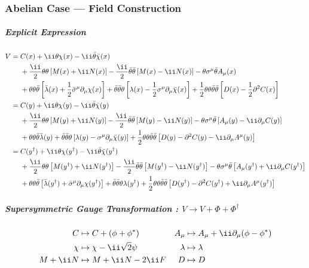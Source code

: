 \subsubsection{Abelian Case --- Field Construction}
\subparagraph{Explicit Expression}
\begin{align}
 V
={}& C(x) + \ii\theta\chi(x) - \ii\btheta\bar\chi(x)\notag
 \\& + \frac\ii2\thth\left[M(x)+\ii N(x)\right]
     - \frac\ii2\bthth\left[M(x)-\ii N(x)\right]
     - \theta\Sm\btheta A_\mu(x)\notag
 \\& + \thth\btheta\left[\bar\lambda(x)+\frac12\bSm\Pm\chi(x)\right]
     + \bthth\theta\left[\lambda(x)-\frac12\Sm\Pm\bar\chi(x)\right]
     + \frac12\thth\bthth\left[D(x)-\frac12\Psq C(x)\right] \\
={}& C(y) + \ii\theta\chi(y) - \ii\btheta\bar\chi(y)\notag
 \\& + \frac\ii2\thth\left[M(y)+\ii N(y)\right]
     - \frac\ii2\bthth\left[M(y)-\ii N(y)\right]
     - \theta\Sm\btheta \left[A_\mu(y)-\ii\Pm C(y)\right]\notag
 \\& + \thth\btheta\bar\lambda(y)
     + \bthth\theta\left[\lambda(y)-\Sm\Pm\bar\chi(y)\right]
     + \frac12\thth\bthth\left[D(y)-\Psq C(y)-\ii\Pm A^\mu(y)\right] \\
={}& C(y^\dagger) + \ii\theta\chi(y^\dagger) - \ii\btheta\bar\chi(y^\dagger)\notag
 \\& + \frac\ii2\thth\left[M(y^\dagger)+\ii N(y^\dagger)\right]
     - \frac\ii2\bthth\left[M(y^\dagger)-\ii N(y^\dagger)\right]
     - \theta\Sm\btheta \left[A_\mu(y^\dagger)+\ii\Pm C(y^\dagger)\right]\notag
 \\& + \thth\btheta\left[\bar\lambda(y^\dagger)+\bSm\Pm\chi(y^\dagger)\right]
     + \bthth\theta\lambda(y^\dagger)
     + \frac12\thth\bthth\left[D(y^\dagger)-\Psq C(y^\dagger)+\ii\Pm A^\mu(y^\dagger)\right]
\end{align}
\subparagraph{Supersymmetric Gauge Transformation :  $V \rightarrow V+\Phi + \Phi^\dagger$}
\begin{align}
C       &\mapsto C+(\phi+\phi^*)      & A_\mu  &\mapsto A_\mu + \ii\Pm(\phi-\phi^*)\notag\\
\chi    &\mapsto \chi - \ii\sqrt2\psi & \lambda&\mapsto \lambda\\
M+\ii N &\mapsto M + \ii N - 2\ii F   & D      &\mapsto D\notag
\end{align}


